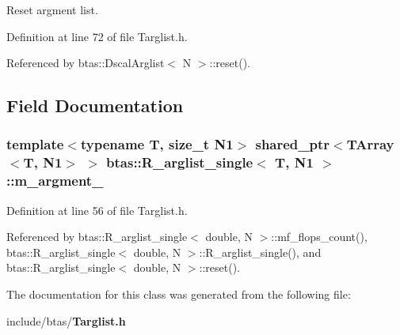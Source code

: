 Reset argment list. 



Definition at line 72 of file Targlist.\-h.



Referenced by btas\-::\-Dscal\-Arglist$<$ N $>$\-::reset().



\subsection{Field Documentation}
\subsubsection[{m\-\_\-argment\-\_\-1}]{\setlength{\rightskip}{0pt plus 5cm}template$<$typename T, size\-\_\-t N1$>$ shared\-\_\-ptr$<${\bf T\-Array}$<$T, N1$>$ $>$ {\bf btas\-::\-R\-\_\-arglist\-\_\-single}$<$ T, N1 $>$\-::m\-\_\-argment\-\_\hspace{0.3cm}{\ttfamily [protected]}}\label{d5/d3b/classbtas_1_1R__arglist__single_a494b1446b8550e2de5c2849aa5cf6cc5}


Definition at line 56 of file Targlist.\-h.



Referenced by btas\-::\-R\-\_\-arglist\-\_\-single$<$ double, N $>$\-::mf\-\_\-flops\-\_\-count(), btas\-::\-R\-\_\-arglist\-\_\-single$<$ double, N $>$\-::\-R\-\_\-arglist\-\_\-single(), and btas\-::\-R\-\_\-arglist\-\_\-single$<$ double, N $>$\-::reset().



The documentation for this class was generated from the following file\-:\begin{DoxyCompactItemize}
\item 
include/btas/{\bf Targlist.\-h}\end{DoxyCompactItemize}
